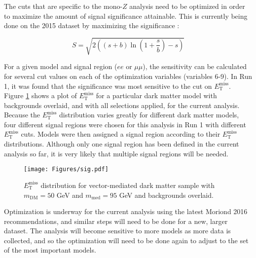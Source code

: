 The cuts that are specific to the mono-$Z$ analysis need to be optimized in order to maximize the amount of signal significance attainable. This is currently being done on the 2015 dataset by maximizing the significance \cite{Cowan:2010js}:

\begin{equation}
S = \sqrt{2 \left( \left( s+b \right) \ln \left( 1+\frac{s}{b} \right) -s \right)}
\label{eqn:s}
\end{equation}

\noindent For a given model and signal region ($ee$ or $\mu\mu$), the sensitivity can be calculated for several cut values on each of the optimization variables (variables 6-9). In Run 1, it was found that the significance was most sensitive to the cut on $E_\text{T}^{\text{miss}}$. Figure \ref{fig:sig} shows a plot of $E_\text{T}^{\text{miss}}$ for a particular dark matter model with backgrounds overlaid, and with all selections applied, for the current analysis. Because the $E_\text{T}^{\text{miss}}$ distribution varies greatly for different dark matter models, four different signal regions were chosen for this analysis in Run 1 with different $E_\text{T}^{\text{miss}}$ cuts. Models were then assigned a signal region according to their $E_\text{T}^{\text{miss}}$ distributions. Although only one signal region has been defined in the current analysis so far, it is very likely that multiple signal regions will be needed.

\begin{figure}[t]
\centering
\texttt{[image: Figures/sig.pdf]}
\caption[$E_\text{T}^{\text{miss}}$ distribution for vector-mediated dark matter sample with $m_\text{DM} = 50$ GeV and $m_\text{med} = 95$ GeV and backgrounds overlaid]{$E_\text{T}^{\text{miss}}$ distribution for vector-mediated dark matter sample with $m_\text{DM} = 50$ GeV and $m_\text{med} = 95$ GeV and backgrounds overlaid.}
\label{fig:sig}
\end{figure}

Optimization is underway for the current analysis using the latest Moriond 2016 recommendations, and similar steps will need to be done for a new, larger dataset. The analysis will become sensitive to more models as more data is collected, and so the optimization will need to be done again to adjust to the set of the most important models.